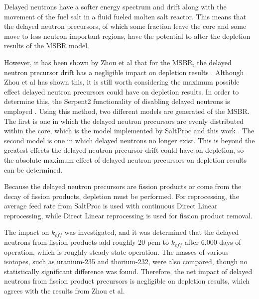 Delayed neutrons have a softer energy spectrum and drift along with the movement of the fuel salt in a fluid fueled molten salt reactor. This means that the delayed neutron precursors, of which some fraction leave the core and some move to less neutron important regions, have the potential to alter the depletion results of the MSBR model.

However, it has been shown by Zhou et al that for the MSBR, the delayed neutron precursor drift has a negligible impact on depletion results \cite{zhou_fuel_2018}. Although Zhou et al has shown this, it is still worth considering the maximum possible effect delayed neutron precursors could have on depletion results. In order to determine this, the Serpent2 functionality of disabling delayed neutrons is employed \cite{leppanen_serpent_2015}. Using this method, two different models are generated of the MSBR. The first is one in which the delayed neutron precursors are evenly distributed within the core, which is the model implemented by SaltProc and this work \cite{rykhlevskii_modeling_2019}. The second model is one in which delayed neutrons no longer exist. This is beyond the greatest effects the delayed neutron precursor drift could have on depletion, so the absolute maximum effect of delayed neutron precursors on depletion results can be determined.

Because the delayed neutron precursors are fission products or come from the decay of fission products, depletion must be performed. For reprocessing, the average feed rate from SaltProc is used with continuous Direct Linear reprocessing, while Direct Linear reprocessing is used for fission product removal.

The impact on $k_{eff}$ was investigated, and it was determined that the delayed neutrons from fission products add roughly 20 pcm to $k_{eff}$ after 6,000 days of operation, which is roughly steady state operation. The masses of various isotopes, such as uranium-235 and thorium-232, were also compared, though no statistically significant difference was found. Therefore, the net impact of delayed neutrons from fission product precursors is negligible on depletion results, which agrees with the results from Zhou et al.



